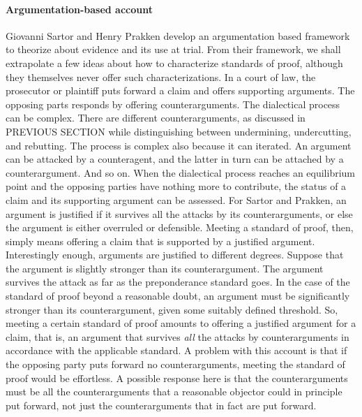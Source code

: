 \documentclass[10pt]{article}
\begin{document}
\paragraph{Argumentation-based account}

Giovanni Sartor and Henry Prakken develop an argumentation based framework to theorize about evidence and its use at trial. From their framework, we shall extrapolate a few ideas about how to characterize standards of proof, although they themselves never offer such characterizations. In a court of law, the prosecutor or plaintiff puts forward a claim and offers supporting arguments. The opposing parts responds by offering counterarguments. The dialectical process can be complex. There are different counterarguments, as discussed in PREVIOUS SECTION while distinguishing between undermining,  undercutting, and rebutting. The process is complex also because it can iterated. 
An argument can be attacked by a counteragent, and the latter in turn can be attached by a counterargument. And so on. 
When the dialectical process reaches an equilibrium point and the opposing parties have nothing more to contribute, 
the status of a claim and its supporting argument can be assessed. For Sartor and Prakken, an argument is justified if it survives all the attacks by its counterarguments, or else the argument is either overruled or defensible. Meeting a standard of proof, then, simply means offering a claim that is supported by a justified argument. Interestingly enough, arguments are justified to different degrees. Suppose that the argument is slightly stronger than its counterargument. The argument survives the attack as far as the preponderance standard goes. In the case of the standard of proof beyond a reasonable doubt, an argument must be significantly stronger than its counterargument, given some suitably defined threshold. So, meeting a certain standard of proof  amounts to offering a justified argument for a claim, that is, an argument that survives \textit{all} the attacks by counterarguments in accordance with the applicable standard. A problem with this account is that if the opposing party puts forward no counterarguments, meeting the standard of proof would be effortless. A possible response here is that the counterarguments must be all the counterarguments that a reasonable objector could in principle put forward, not just the counterarguments that in fact are put forward. 
\end{document}
